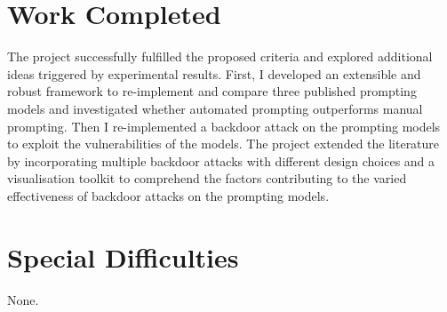 \documentclass[12pt,a4paper,twoside,openright]{report}
\begin{document}
\section*{Work Completed}
The project successfully fulfilled the proposed criteria and explored additional ideas triggered by experimental results. First, I developed an extensible and robust framework to re-implement and compare three published prompting models and investigated whether automated prompting outperforms manual prompting. Then I re-implemented a backdoor attack on the prompting models to exploit the vulnerabilities of the models. The project extended the literature by incorporating multiple backdoor attacks with different design choices and a visualisation toolkit to comprehend the factors contributing to the varied effectiveness of backdoor attacks on the prompting models.

\section*{Special Difficulties}

None.

\tableofcontents


\newpage
{}






\newpage
{}
\printbibliography
\newpage
\appendix


\resumechapters
{}


\end{document}
